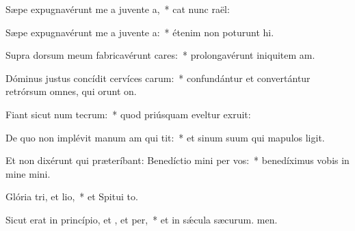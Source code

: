 \item Sæpe expugnavérunt me a juvente a,~* cat nunc raël:
\item Sæpe expugnavérunt me a juvente a:~* étenim non poturunt hi.
\item Supra dorsum meum fabricavérunt cares:~* prolongavérunt iniquitem am.
\item Dóminus justus concídit cervíces carum:~* confundántur et convertántur retrórsum omnes, qui orunt on.
\item Fiant sicut num tecrum:~* quod priúsquam eveltur exruit:
\item De quo non implévit manum am qui tit:~* et sinum suum qui mapulos ligit.
\item Et non dixérunt qui præteríbant: Benedíctio mini per vos:~* benedíximus vobis in mine mini.
\item Glória tri, et lio,~* et Spitui to.
\item Sicut erat in princípio, et , et per,~* et in sǽcula sæcurum. men.
